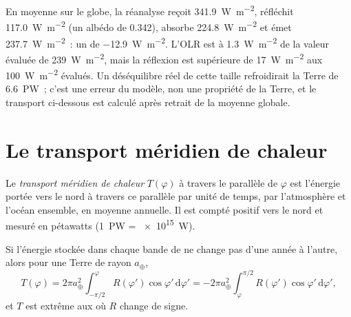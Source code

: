 \begin{example}\label{ex:b1:radiation-heat-transport:global}
En moyenne sur le globe, la réanalyse reçoit \qty{341.9}{W.m^{-2}}, réfléchit
\qty{117.0}{W.m^{-2}} (un albédo de \num{0.342}), absorbe \qty{224.8}{W.m^{-2}} et
émet \qty{237.7}{W.m^{-2}}~: un  de \qty{-12.9}{W.m^{-2}}. L'OLR est
à \qty{1.3}{W.m^{-2}} de la valeur évaluée de \qty{239}{W.m^{-2}}, mais la réflexion
est supérieure de \qty{17}{W.m^{-2}} aux \qty{100}{W.m^{-2}} évalués. Un déséquilibre réel
de cette taille refroidirait la Terre de \qty{6.6}{PW}~; c'est une erreur du
modèle, non une propriété de la Terre, et le transport ci-dessous est calculé après
retrait de la moyenne globale.
\end{example}

\section{Le transport méridien de chaleur}\label{sec:b1:radiation-heat-transport:transport}

\begin{definition}\label{def:b1:radiation-heat-transport:mht}
Le \emph{transport méridien de chaleur} $T(\varphi)$
à travers le parallèle de  $\varphi$ est l'énergie portée vers le nord à travers
ce parallèle par unité de temps, par l'atmosphère et l'océan ensemble, en moyenne annuelle.
Il est compté positif vers le nord et mesuré en pétawatts
(\qty{1}{PW} = \qty{e15}{W}).
\end{definition}

\begin{proposition}\label{prop:b1:radiation-heat-transport:mht}
Si l'énergie stockée dans chaque bande de  ne change pas d'une année à l'autre, alors
pour une Terre de rayon $a_\oplus$,
\[
  T(\varphi) = 2\pi a_\oplus^2\int_{-\pi/2}^{\varphi} R(\varphi')\cos\varphi'\,
  \mathrm d\varphi' = -2\pi a_\oplus^2\int_{\varphi}^{\pi/2} R(\varphi')\cos
  \varphi'\,\mathrm d\varphi' ,
\]
et $T$ est extrême aux  où $R$ change de signe.
\end{proposition}

